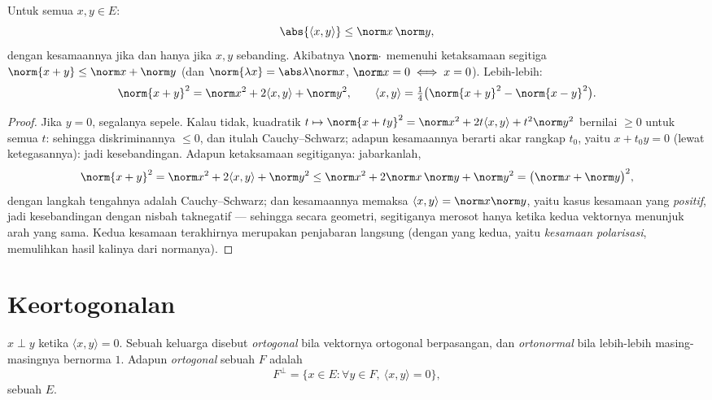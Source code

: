 \begin{theorem}\label{thm:b1:euclid:cs}
Untuk semua $x, y \in E$:
\[
\abs{\langle x, y\rangle} \leq \norm x\, \norm y ,
\]
dengan kesamaannya jika dan hanya jika $x, y$ sebanding. Akibatnya $\norm\cdot$
memenuhi ketaksamaan segitiga $\norm{x + y} \leq \norm x + \norm
y$ (dan $\norm{\lambda x} = \abs\lambda \norm x$, $\norm x = 0 \iff
x = 0$). Lebih-lebih:
\[
\norm{x+y}^2 = \norm x^2 + 2\langle x, y\rangle + \norm y^2,
\qquad
\langle x, y \rangle = \tfrac14\bigl(\norm{x+y}^2 -
\norm{x-y}^2\bigr) .
\]
\end{theorem}

\begin{proof}
Jika $y = 0$, segalanya sepele. Kalau tidak, kuadratik $t
\mapsto \norm{x + ty}^2 = \norm x^2 + 2t\langle x, y\rangle + t^2
\norm y^2$ bernilai $\geq 0$ untuk semua $t$: sehingga diskriminannya $\leq 0$,
dan itulah Cauchy--Schwarz; adapun kesamaannya berarti akar rangkap $t_0$, yaitu
$x + t_0 y = 0$ (lewat ketegasannya): jadi kesebandingan. Adapun ketaksamaan
segitiganya: jabarkanlah,
\[
\norm{x + y}^2 = \norm x^2 + 2\langle x, y\rangle + \norm y^2
\leq \norm x^2 + 2\norm x\,\norm y + \norm y^2
= \bigl(\norm x + \norm y\bigr)^2 ,
\]
dengan langkah tengahnya adalah Cauchy--Schwarz; dan kesamaannya memaksa $\langle
x, y\rangle = \norm x\norm y$, yaitu kasus kesamaan yang
\emph{positif}, jadi kesebandingan dengan nisbah taknegatif ---
sehingga secara geometri, segitiganya merosot hanya ketika kedua
vektornya menunjuk arah yang sama. Kedua kesamaan terakhirnya
merupakan penjabaran langsung (dengan yang kedua, yaitu
\emph{kesamaan polarisasi}, memulihkan hasil kalinya dari normanya).
\end{proof}

\section{Keortogonalan}

\begin{definition}\label{def:b1:euclid:orthogonal}
$x \perp y$ ketika $\langle x, y \rangle = 0$. Sebuah keluarga disebut
\emph{ortogonal} bila vektornya ortogonal berpasangan, dan
\emph{ortonormal} bila lebih-lebih masing-masingnya
bernorma $1$. Adapun \emph{ ortogonal} sebuah  $F$ adalah
\[
F^{\perp} = \{x \in E : \forall y \in F,\ \langle x, y\rangle =
0\},
\]
sebuah  $E$.
\end{definition}

